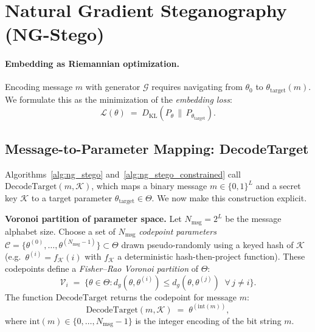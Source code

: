 \documentclass[a4paper,fleqn]{cas-dc}
\newcommand{\calG}{\mathcal{G}}
\newcommand{\DKL}{D_{\mathrm{KL}}}
\begin{document}
\section{Natural Gradient Steganography (NG-Stego)}
\label{sec:natural_gradient}

\paragraph{Embedding as Riemannian optimization.}

Encoding message $m$ with generator $\calG$ requires navigating from
$\theta_0$ to $\theta_\mathrm{target}(m)$.
We formulate this as the minimization of the \emph{embedding loss}:
\begin{equation}
  \mathcal{L}(\theta) \;=\; \DKL\!\left(P_\theta \,\|\, P_{\theta_\mathrm{target}}\right).
  \label{eq:embedding_loss}
\end{equation}

\subsection{Message-to-Parameter Mapping: DecodeTarget}
\label{subsec:decodetarget}

Algorithms~\ref{alg:ng_stego} and~\ref{alg:ng_stego_constrained} call
$\mathrm{DecodeTarget}(m, \mathcal{K})$, which maps a binary message
$m\in\{0,1\}^L$ and a secret key $\mathcal{K}$ to a target parameter
$\theta_{\mathrm{target}}\in\Theta$.
We now make this construction explicit.

\noindent\textbf{Voronoi partition of parameter space.}
Let $N_{\mathrm{msg}} = 2^L$ be the message alphabet size.
Choose a set of $N_{\mathrm{msg}}$ \emph{codepoint parameters}
$\mathcal{C} = \{\theta^{(0)}, \ldots, \theta^{(N_{\mathrm{msg}}-1)}\}\subset\Theta$
drawn pseudo-randomly using a keyed hash of $\mathcal{K}$
(e.g.\ $\theta^{(i)} = f_{\mathcal{K}}(i)$ with $f_{\mathcal{K}}$ a
deterministic hash-then-project function).
These codepoints define a \emph{Fisher--Rao Voronoi partition} of $\Theta$:
\[
  \mathcal{V}_i \;=\; \bigl\{\theta\in\Theta : d_g(\theta, \theta^{(i)})
  \leq d_g(\theta, \theta^{(j)})\;\;\forall\, j\neq i\bigr\}.
\]
The function $\mathrm{DecodeTarget}$ returns the codepoint for message $m$:
\[
  \mathrm{DecodeTarget}(m, \mathcal{K})
  \;=\; \theta^{(\mathrm{int}(m))},
\]
where $\mathrm{int}(m)\in\{0,\ldots,N_{\mathrm{msg}}-1\}$ is the integer
encoding of the bit string $m$.
\end{document}
